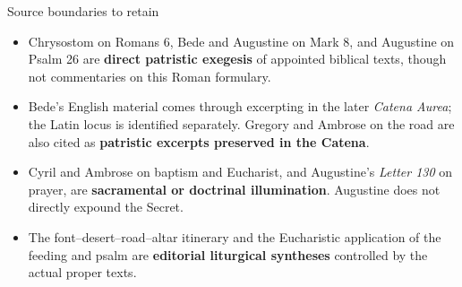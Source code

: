 \begin{deepstudy}
\begin{studybox}{Source boundaries to retain}
\begin{itemize}
\item Chrysostom on Romans 6, Bede and Augustine on Mark 8, and Augustine on Psalm 26 are \textbf{direct patristic exegesis} of appointed biblical texts, though not commentaries on this Roman formulary.
\item Bede's English material comes through excerpting in the later \emph{Catena Aurea}; the Latin locus is identified separately. Gregory and Ambrose on the road are also cited as \textbf{patristic excerpts preserved in the Catena}.
\item Cyril and Ambrose on baptism and Eucharist, and Augustine's \emph{Letter 130} on prayer, are \textbf{sacramental or doctrinal illumination}. Augustine does not directly expound the Secret.
\item The font--desert--road--altar itinerary and the Eucharistic application of the feeding and psalm are \textbf{editorial liturgical syntheses} controlled by the actual proper texts.
\end{itemize}
\end{studybox}

\sectionguard

\end{deepstudy}
